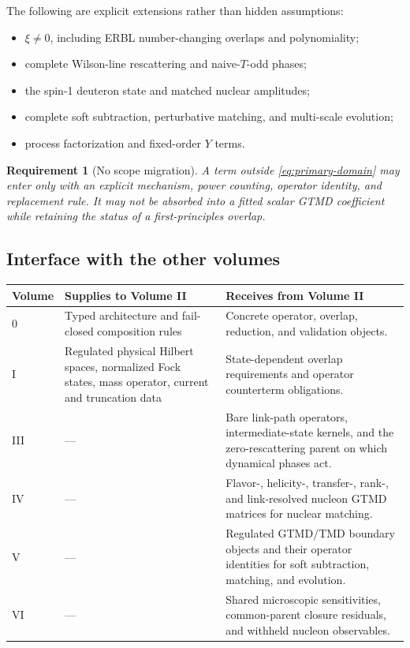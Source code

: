 \documentclass[11pt]{article}
\newtheorem{requirement}[definition]{Requirement}
\begin{document}
The following are explicit extensions rather than hidden assumptions:
\begin{itemize}
\item \(\xi\ne0\), including ERBL number-changing overlaps and polynomiality;
\item complete Wilson-line rescattering and naive-\(T\)-odd phases;
\item the spin-1 deuteron state and matched nuclear amplitudes;
\item complete soft subtraction, perturbative matching, and multi-scale
      evolution;
\item process factorization and fixed-order \(Y\) terms.
\end{itemize}

\begin{requirement}[No scope migration]
\label{req:no-scope-migration}
A term outside \cref{eq:primary-domain} may enter only with an explicit
mechanism, power counting, operator identity, and replacement rule.  It may
not be absorbed into a fitted scalar GTMD coefficient while retaining the
status of a first-principles overlap.
\end{requirement}

\subsection{Interface with the other volumes}

\begin{longtable}{L{0.16\textwidth}L{0.35\textwidth}L{0.39\textwidth}}
\toprule
Volume & Supplies to Volume II & Receives from Volume II\\
\midrule
{} & Typed architecture and fail-closed composition rules & Concrete operator, overlap, reduction, and validation objects.\\
I & Regulated physical Hilbert spaces, normalized Fock states, mass operator, current and truncation data & State-dependent overlap requirements and operator counterterm obligations.\\
III & --- & Bare link-path operators, intermediate-state kernels, and the zero-rescattering parent on which dynamical phases act.\\
IV & --- & Flavor-, helicity-, transfer-, rank-, and link-resolved nucleon GTMD matrices for nuclear matching.\\
V & --- & Regulated GTMD/TMD boundary objects and their operator identities for soft subtraction, matching, and evolution.\\
VI & --- & Shared microscopic sensitivities, common-parent closure residuals, and withheld nucleon observables.\\
\bottomrule
\end{longtable}
\end{document}
